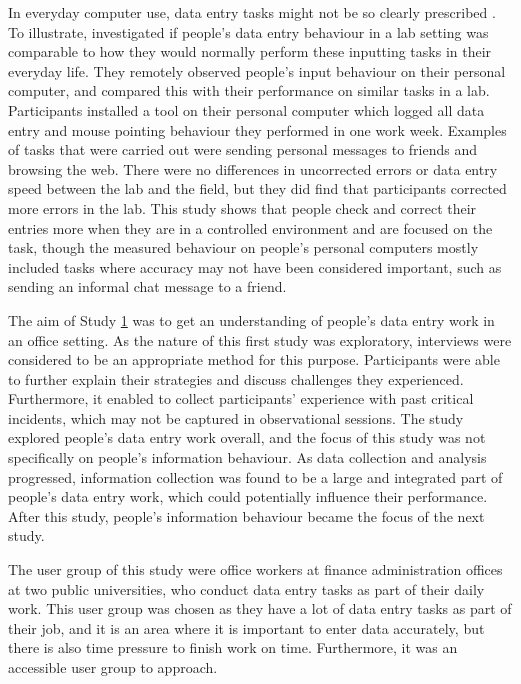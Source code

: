 In everyday computer use, data entry tasks might not be so clearly prescribed \citep{Evans2012}. To illustrate, \citet{Evans2012} investigated if people's data entry behaviour in a lab setting was comparable to how they would normally perform these inputting tasks in their everyday life. They remotely observed people's input behaviour on their personal computer, and compared this with their performance on similar tasks in a lab. Participants installed a tool on their personal computer which logged all data entry and mouse pointing behaviour they performed in one work week. Examples of tasks that were carried out were sending personal messages to friends and browsing the web. There were no differences in uncorrected errors or data entry speed between the lab and the field, but they did find that participants corrected more errors in the lab. This study shows that people check and correct their entries more when they are in a controlled environment and are focused on the task, though the measured behaviour on people's personal computers mostly included tasks where accuracy may not have been considered important, such as sending an informal chat message to a friend. 

The aim of Study \hyperref[st:Study1]{1} was to get an understanding of people's data entry work in an office setting. As the nature of this first study was exploratory, interviews were considered to be an appropriate method for this purpose. Participants were able to further explain their strategies and discuss challenges they experienced. Furthermore, it enabled to collect participants' experience with past critical incidents, which may not be captured in observational sessions. The study explored people's data entry work overall, and the focus of this study was not specifically on people's information behaviour. As data collection and analysis progressed, information collection was found to be a large and integrated part of people's data entry work, which could potentially influence their performance. After this study, people's information behaviour became the focus of the next study.

The user group of this study were office workers at finance administration offices at two public universities, who conduct data entry tasks as part of their daily work.  This user group was chosen as they have a lot of data entry tasks as part of their job, and it is an area where it is important to enter data accurately, but there is also time pressure to finish work on time. Furthermore, it was an accessible user group to approach.


